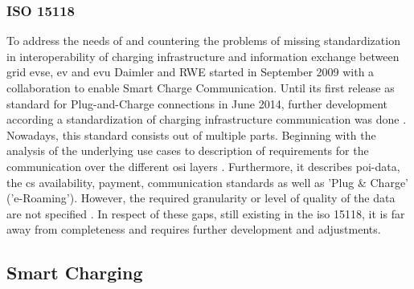 \subsubsection{ISO 15118}
\label{ch:Fundamentals:sec:Electric Mobility:ssec:Relevant Standards:sssec:ISO 15118}

To address the needs of  and countering the problems of missing standardization in interoperability of charging infrastructure and information exchange between grid \acrshort{evse}, \acrshort{ev} and \acrshort{evu} Daimler and RWE started in September 2009 with a collaboration to enable Smart Charge Communication.
Until its first release as standard for Plug-and-Charge connections in June 2014, further development according a standardization of charging infrastructure communication was done \cite{heinrich_iso_2017}.
Nowadays, this standard consists out of multiple parts. Beginning with the analysis of the underlying use cases to description of requirements for the communication over the different \acrshort{osi} layers \cite{brosi_methode_2019}.
Furthermore, it describes \acrshort{poi}-data, the \acrshort{cs} availability, payment, communication standards as well as 'Plug \& Charge' ('e-Roaming'). However, the required granularity or level of quality of the data are not specified \cite{linnemann_elektromobilitat_2020}.
In respect of these gaps, still existing in the \acrshort{iso} 15118, it is far away from completeness and requires further development and adjustments.

\subsection{Smart Charging}
\label{ch:Fundamentals:sec:Electric Mobility:ssec:Smart Charging}

